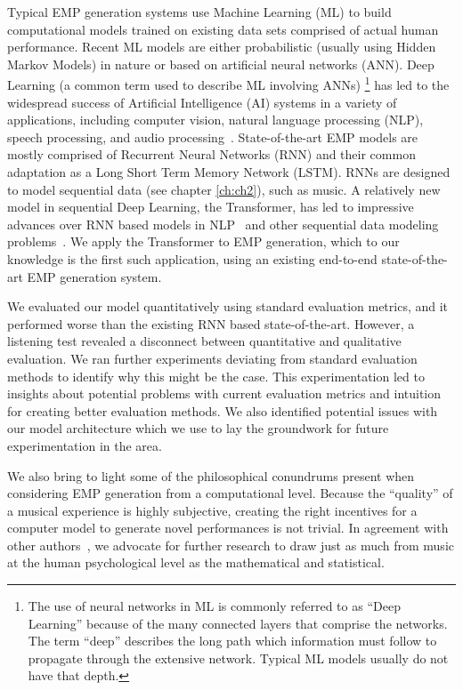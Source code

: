 Typical EMP generation systems use Machine Learning (ML) to build computational models trained on existing data sets comprised of actual human performance. Recent ML models are either probabilistic (usually using Hidden Markov Models) in nature or based on artificial neural networks (ANN). Deep Learning (a common term used to describe ML involving ANNs)%
\footnote{The use of neural networks in ML is commonly referred to as ``Deep Learning'' because of the many connected layers that comprise the networks. The term ``deep'' describes the long path which information must follow to propagate through the extensive network. Typical ML models usually do not have that depth.} has led to the widespread success of Artificial Intelligence (AI) systems in a variety of applications, including computer vision, natural language processing (NLP), speech processing, and audio processing~\cite{goodfellow2016deep}. State-of-the-art EMP models are mostly comprised of Recurrent Neural Networks (RNN) and their common adaptation as a Long Short Term Memory Network (LSTM). RNNs are designed to model sequential data (see chapter \ref{ch:ch2}), such as music. A relatively new model in sequential Deep Learning, the Transformer, has led to impressive advances over RNN based models in NLP~\cite{devlin2018bert,brown2020language} and other sequential data modeling problems~\cite{dosovitskiy2020image}. We apply the Transformer to EMP generation, which to our knowledge is the first such application, using an existing end-to-end state-of-the-art EMP generation system. 

We evaluated our model quantitatively using standard evaluation metrics, and it performed worse than the existing RNN based state-of-the-art. However, a listening test revealed a disconnect between quantitative and qualitative evaluation. We ran further experiments deviating from standard evaluation methods to identify why this might be the case. This experimentation led to insights about potential problems with current evaluation metrics and intuition for creating better evaluation methods. We also identified potential issues with our model architecture which we use to lay the groundwork for future experimentation in the area. 

We also bring to light some of the philosophical conundrums present when considering EMP generation from a computational level. Because the ``quality'' of a musical experience is highly subjective, creating the right incentives for a computer model to generate novel performances is not trivial. In agreement with other authors~\cite{widmer2016getting}, we advocate for further research to draw just as much from music at the human psychological level as the mathematical and statistical. 